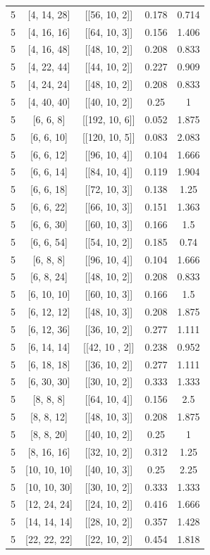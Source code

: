 \documentclass[%
reprint,
amsmath,amssymb,
aps,
]{revtex4-2}
\begin{document}
\begin{table}[b]
\begin{ruledtabular}
\begin{tabular}{|c|c|c|c|c|}
	5 & [4, 14, 28] & [[56, 10, 2]] & 0.178 & 0.714  \\
	5 & [4, 16, 16] & [[64, 10, 3]] & 0.156 & 1.406  \\
	5 & [4, 16, 48] & [[48, 10, 2]] & 0.208 & 0.833  \\
	5 & [4, 22, 44] & [[44, 10, 2]] & 0.227 & 0.909  \\
	5 & [4, 24, 24] & [[48, 10, 2]] & 0.208 & 0.833  \\
	5 & [4, 40, 40] & [[40, 10, 2]] & 0.25 & 1  \\
	5 & [6, 6, 8] & [[192, 10, 6]] & 0.052 & 1.875 \\
	5 & [6, 6, 10] & [[120, 10, 5]] & 0.083 & 2.083  \\
	5 & [6, 6, 12] & [[96, 10, 4]] & 0.104 & 1.666  \\
	5 & [6, 6, 14] & [[84, 10, 4]] & 0.119 & 1.904  \\
	5 & [6, 6, 18] & [[72, 10, 3]] & 0.138 & 1.25  \\
	5 & [6, 6, 22] & [[66, 10, 3]] & 0.151 & 1.363  \\
	5 & [6, 6, 30] & [[60, 10, 3]] & 0.166 & 1.5 \\
	5 & [6, 6, 54] & [[54, 10, 2]] & 0.185 & 0.74   \\
	5 & [6, 8, 8] & [[96, 10, 4]] & 0.104 & 1.666  \\
	5 & [6, 8, 24] & [[48, 10, 2]] & 0.208 & 0.833  \\
	5 & [6, 10, 10] & [[60, 10, 3]] & 0.166 & 1.5  \\
	5 & [6, 12, 12] & [[48, 10, 3]] & 0.208 & 1.875  \\
	5 & [6, 12, 36] & [[36, 10, 2]] & 0.277 & 1.111  \\
	5 & [6, 14, 14] & [[42, 10 , 2]] & 0.238 & 0.952  \\
	5 & [6, 18, 18] & [[36, 10, 2]] & 0.277 & 1.111  \\
	5 & [6, 30, 30] & [[30, 10, 2]] & 0.333 & 1.333  \\
	5 & [8, 8, 8] & [[64, 10, 4]] & 0.156 & 2.5   \\
	5 & [8, 8, 12] & [[48, 10, 3]] & 0.208 & 1.875   \\
	5 & [8, 8, 20] & [[40, 10, 2]] & 0.25 & 1   \\
	5 & [8, 16, 16] & [[32, 10, 2]] & 0.312 & 1.25  \\
	5 & [10, 10, 10] & [[40, 10, 3]] & 0.25 & 2.25  \\
	5 & [10, 10, 30] & [[30, 10, 2]] & 0.333 & 1.333   \\
	5 & [12, 24, 24] & [[24, 10, 2]] & 0.416 & 1.666  \\
	5 & [14, 14, 14] & [[28, 10, 2]] & 0.357 & 1.428  \\
	5 & [22, 22, 22] & [[22, 10, 2]] & 0.454 & 1.818 \\ 
			\end{tabular}
\end{ruledtabular}
\end{table}
	
\end{document}
